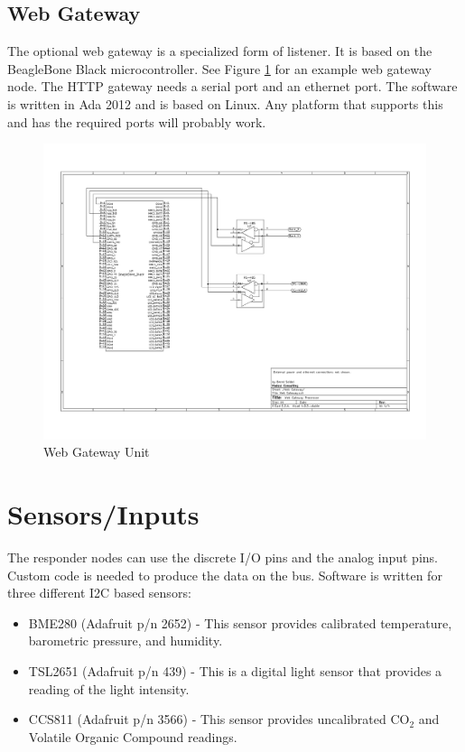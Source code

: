 \documentclass[10pt]{article}
\begin{document}
\subsection{Web Gateway}
The optional web gateway is a specialized form of listener.  It is based on the BeagleBone Black microcontroller.  See Figure \ref{fig:gateway} for an example web gateway node.  The HTTP gateway needs a serial port and an ethernet port.  The software is written in Ada 2012 and is based on Linux.  Any platform that supports this and has the required ports will probably work.

\begin{figure}
  \centering
  \includegraphics[width=\textwidth]{WebGateway.pdf}
  \caption{Web Gateway Unit}
  \label{fig:gateway}
\end{figure}

\section{Sensors/Inputs}
The responder nodes can use the discrete I/O pins and the analog input pins.  Custom code is needed to produce the data on the bus.  Software is written for three different I2C based sensors:

\begin{itemize}
  \item BME280 (Adafruit p/n 2652) - This sensor provides calibrated temperature, barometric pressure, and humidity.
  \item TSL2651 (Adafruit p/n 439) - This is a digital light sensor that provides a reading of the light intensity.
  \item CCS811 (Adafruit p/n 3566) - This sensor provides uncalibrated CO$_2$ and Volatile Organic Compound readings.
\end{itemize}
\end{document}
